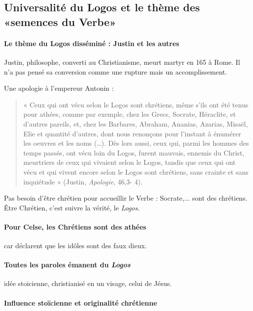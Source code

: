 \subsection{Universalité du Logos et le thème des «semences du Verbe»}

 \paragraph{Le thème du Logos disséminé : Justin et les autres} Justin, philosophe, converti au Christianisme, meurt martyr en 165 à Rome. Il n'a pas pensé sa conversion comme une rupture mais un accomplissement. 

Une apologie à l'empereur Antonin : 
\begin{quote}
    « Ceux qui ont vécu selon le Logos sont chrétiens, même s’ils ont été tenus pour athées,
comme par exemple, chez les Grecs, Socrate, Héraclite, et d’autres pareils, et, chez les
Barbares, Abraham, Ananias, Azarias, Misaël, Elie et quantité d’autres, dont nous renonçons
pour l’instant à énumérer les oeuvres et les noms (…). Dès lors aussi, ceux qui, parmi les
hommes des temps passés, ont vécu loin du Logos, furent mauvais, ennemis du Christ,
meurtriers de ceux qui vivaient selon le Logos, tandis que ceux qui ont vécu et qui vivent encore selon le Logos sont chrétiens, sans crainte et sans inquiétude » (Justin, \textit{Apologie}, 46,3-
4).
\end{quote}
\begin{Prop}
Pas besoin d'être chrétien pour accueillir le Verbe : Socrate,... sont des chrétiens.
Être Chrétien, c'est suivre la vérité, le \textit{Logos}.
\end{Prop}

\paragraph{Pour Celse, les Chrétiens sont des athées} car déclarent que les idôles sont des faux dieux. 


\paragraph{Toutes les paroles émanent du \textit{Logos}} idée stoicienne, christianisé en un visage, celui de Jésus. 

\paragraph{Influence stoïcienne et originalité chrétienne} 





